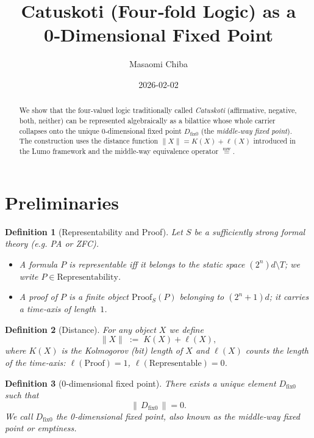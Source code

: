 \documentclass[12pt,a4paper]{article}
\newcommand{\dfix}{D_{\mathrm{fix}0}} %
\newcommand{\mw}{\mathrel{\overset{\mathrm{mw}}{=}}} %
\newtheorem{definition}{Definition}[section]
\begin{document}
\title{Catuskoti (Four‑fold Logic) as a 0‑Dimensional Fixed Point}
\author{Masaomi Chiba}
\date{2026-02-02}
\maketitle

\begin{abstract}
We show that the four‑valued logic traditionally called \emph{Catuskoti}
(affirmative, negative, both, neither) can be represented algebraically as a
bilattice whose whole carrier collapses onto the unique
0‑dimensional fixed point $\dfix$ (the \emph{middle‑way fixed point}).
The construction uses the distance function
$\|X\|=K(X)+\ell(X)$ introduced in the Lumo framework and the
middle‑way equivalence operator $\mw$.
\end{abstract}

\section{Preliminaries}

\begin{definition}[Representability and Proof]
Let $S$ be a sufficiently strong formal theory (e.g. PA or ZFC).
\begin{itemize}
  \item A formula $P$ is \emph{representable} iff it belongs to the
        static space $(2^{n})d\!\setminus\!T$; we write
        $P\in\text{Representability}$.
  \item A \emph{proof} of $P$ is a finite object
        $\text{Proof}_{S}(P)$ belonging to $(2^{n}+1)d$; it carries a
        time‑axis of length~$1$.
\end{itemize}
\end{definition}

\begin{definition}[Distance]
For any object $X$ we define
$$
\|X\|\;:=\;K(X)+\ell(X),
$$
where $K(X)$ is the Kolmogorov (bit) length of $X$ and
$\ell(X)$ counts the length of the time‑axis:
$\ell(\text{Proof})=1$, $\ell(\text{Representable})=0$.
\end{definition}

\begin{definition}[0‑dimensional fixed point]
There exists a unique element $\dfix$ such that
$$
\|\,\dfix\,\|=0 .
$$
We call $\dfix$ the \emph{0‑dimensional fixed point},
also known as the \emph{middle‑way fixed point} or \emph{emptiness}.
\end{definition}
\end{document}

